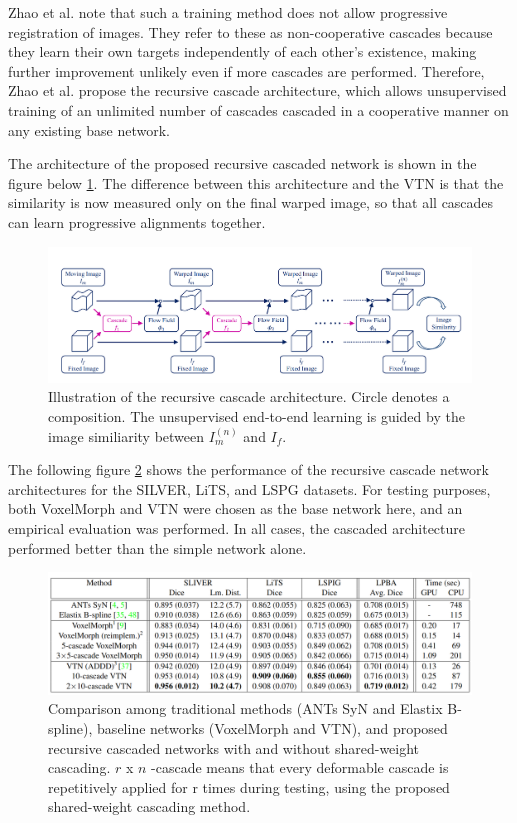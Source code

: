 \documentclass{report}
\begin{document}
	Zhao et al. \cite{Zhao_2019} note that such a training method does not allow progressive registration of images. They refer to these as non-cooperative cascades because they learn their own targets independently of each other's existence, making further improvement unlikely even if more cascades are performed. Therefore, Zhao et al. \cite{Zhao_2019} propose the recursive cascade architecture, which allows unsupervised training of an unlimited number of cascades cascaded in a cooperative manner on any existing base network.
	
	The architecture of the proposed recursive cascaded network is shown in the figure below \ref{fig:recursive}. The difference between this architecture and the VTN is that the similarity is now measured only on the final warped image, so that all cascades can learn progressive alignments together.
	
	\begin{figure}[H]
		\centering
		\includegraphics[width=\columnwidth]{resources/chapter2/recursive.png}
		\caption{Illustration of the recursive cascade architecture. Circle denotes a composition. The unsupervised end-to-end learning is guided by the image similiarity between $I_m^{(n)}$ and $I_f$.\cite{Zhao_2019}}
		\label{fig:recursive}
	\end{figure}
	
	The following figure \ref{fig:recursive_result} shows the performance of the recursive cascade network architectures for the SILVER, LiTS, and LSPG datasets. For testing purposes, both VoxelMorph and VTN were chosen as the base network here, and an empirical evaluation was performed. In all cases, the cascaded architecture performed better than the simple network alone.
	
	\begin{figure}[H]
		\centering
		\includegraphics[width=\columnwidth]{resources/chapter2/recursive_result.png}
		\caption{Comparison among traditional methods (ANTs SyN and Elastix B-spline), baseline networks (VoxelMorph and VTN), and proposed recursive cascaded networks with and without shared-weight cascading. $r$ x $n$ -cascade means that every deformable cascade is repetitively applied for r times during testing, using the proposed shared-weight cascading method. \cite{Zhao_2019}}
		\label{fig:recursive_result}
	\end{figure}
	
\end{document}
